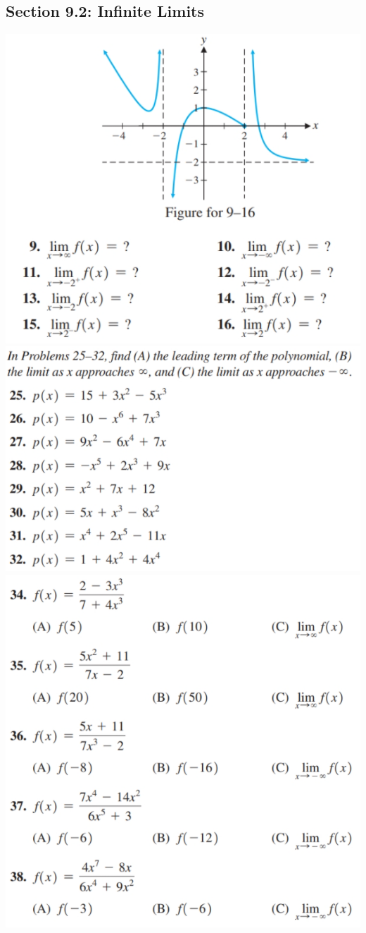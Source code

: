 \documentclass[14pt]{extarticle}
\begin{document}
\subsection*{Section 9.2: Infinite Limits}
\begin{center}
	\includegraphics[width=0.8\linewidth]{9-2-8} \\
	\includegraphics[width=0.8\linewidth]{9-2-9} \\
	\includegraphics[width=0.74\linewidth]{9-2-10} \\
\end{center}
\end{document}

